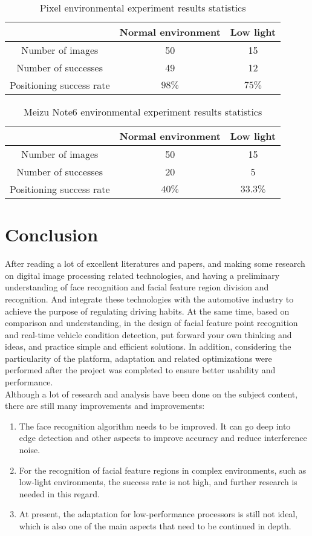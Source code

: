 \documentclass[12pt, a4paper]{article}
\begin{document}
\begin{table}[h!]
  \centering
  \caption{Pixel environmental experiment results statistics}
  \label{tab:table1}
  \begin{tabular}{ccc}
    \toprule
        & Normal environment & Low light\\
    \midrule
    Number of images & 50 & 15\\
    Number of successes & 49 & 12\\
    Positioning success rate & $98\%$ & $75\%$\\
    \bottomrule
  \end{tabular}
\end{table}

\begin{table}[h!]
  \centering
  \caption{Meizu Note6 environmental experiment results statistics}
  \label{tab:table1}
  \begin{tabular}{ccc}
    \toprule
        & Normal environment & Low light\\
    \midrule
    Number of images & 50 & 15\\
    Number of successes & 20 & 5\\
    Positioning success rate & $40\%$ & $33.3\%$\\
    \bottomrule
  \end{tabular}
\end{table}

\section{Conclusion}
After reading a lot of excellent literatures and papers, and making some research on digital image processing related technologies, and having a preliminary understanding of face recognition and facial feature region division and recognition. And integrate these technologies with the automotive industry to achieve the purpose of regulating driving habits. At the same time, based on comparison and understanding, in the design of facial feature point recognition and real-time vehicle condition detection, put forward your own thinking and ideas, and practice simple and efficient solutions. In addition, considering the particularity of the platform, adaptation and related optimizations were performed after the project was completed to ensure better usability and performance.\\
Although a lot of research and analysis have been done on the subject content, there are still many improvements and improvements:
\begin{enumerate}
  \item The face recognition algorithm needs to be improved. It can go deep into edge detection and other aspects to improve accuracy and reduce interference noise.
  \item For the recognition of facial feature regions in complex environments, such as low-light environments, the success rate is not high, and further research is needed in this regard.
  \item At present, the adaptation for low-performance processors is still not ideal, which is also one of the main aspects that need to be continued in depth.
\end{enumerate}
\end{document}
